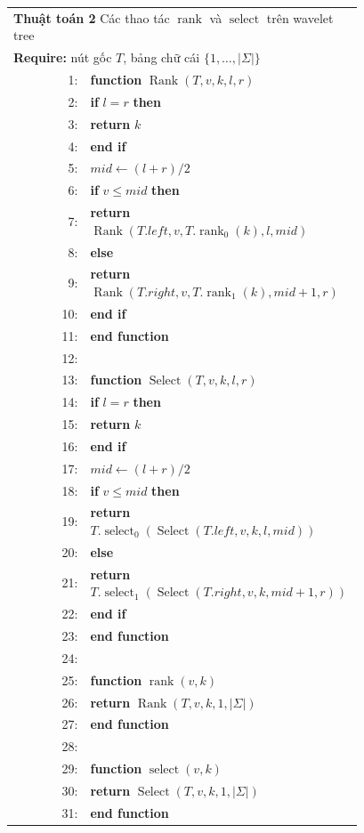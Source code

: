 \documentclass[11pt]{article}
\DeclareMathOperator{\rank}{rank}
\begin{document}
\begin{center}
\small
\begin{tabular}{r@{\quad}p{0.78\linewidth}}
\multicolumn{2}{l}{\textbf{Thuật toán 2} Các thao tác \(\rank\) và
\(\operatorname{select}\) trên wavelet tree}\\
\multicolumn{2}{l}{\textbf{Require:} nút gốc \(T\), bảng chữ cái
\(\{1,\ldots,|\Sigma|\}\)}\\
1: & \textbf{function} \(\operatorname{Rank}(T,v,k,l,r)\)\\
2: & \quad \textbf{if} \(l=r\) \textbf{then}\\
3: & \qquad \textbf{return} \(k\)\\
4: & \quad \textbf{end if}\\
5: & \quad \(\mathit{mid}\gets(l+r)/2\)\\
6: & \quad \textbf{if} \(v\le \mathit{mid}\) \textbf{then}\\
7: & \qquad \textbf{return}
      \(\operatorname{Rank}(T.\mathit{left},v,T.\rank_0(k),l,\mathit{mid})\)\\
8: & \quad \textbf{else}\\
9: & \qquad \textbf{return}
      \(\operatorname{Rank}(T.\mathit{right},v,T.\rank_1(k),\mathit{mid}+1,r)\)\\
10: & \quad \textbf{end if}\\
11: & \textbf{end function}\\
12: & \\
13: & \textbf{function} \(\operatorname{Select}(T,v,k,l,r)\)\\
14: & \quad \textbf{if} \(l=r\) \textbf{then}\\
15: & \qquad \textbf{return} \(k\)\\
16: & \quad \textbf{end if}\\
17: & \quad \(\mathit{mid}\gets(l+r)/2\)\\
18: & \quad \textbf{if} \(v\le \mathit{mid}\) \textbf{then}\\
19: & \qquad \textbf{return}
      \(T.\operatorname{select}_0(
      \operatorname{Select}(T.\mathit{left},v,k,l,\mathit{mid}))\)\\
20: & \quad \textbf{else}\\
21: & \qquad \textbf{return}
      \(T.\operatorname{select}_1(
      \operatorname{Select}(T.\mathit{right},v,k,\mathit{mid}+1,r))\)\\
22: & \quad \textbf{end if}\\
23: & \textbf{end function}\\
24: & \\
25: & \textbf{function} \(\operatorname{rank}(v,k)\)\\
26: & \quad \textbf{return} \(\operatorname{Rank}(T,v,k,1,|\Sigma|)\)\\
27: & \textbf{end function}\\
28: & \\
29: & \textbf{function} \(\operatorname{select}(v,k)\)\\
30: & \quad \textbf{return} \(\operatorname{Select}(T,v,k,1,|\Sigma|)\)\\
31: & \textbf{end function}
\end{tabular}
\end{center}
\end{document}
